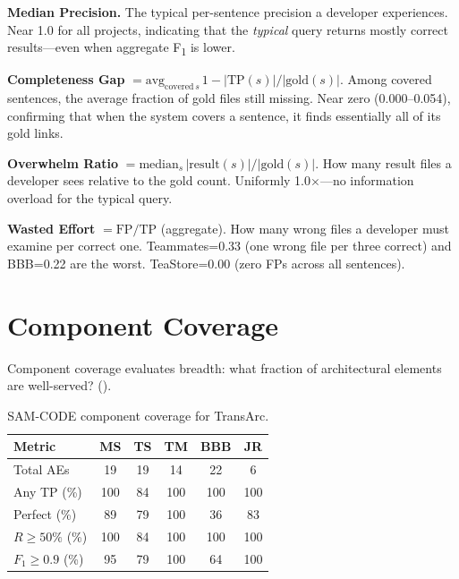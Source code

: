 \documentclass[11pt,a4paper]{report}
\newcommand{\samcode}{SAM-CODE\xspace}
\newcommand{\transarc}{TransArc\xspace}
\newcommand{\fone}{F\textsubscript{1}\xspace}
\begin{document}
\textbf{Median Precision.} The typical per-sentence precision a developer
experiences. Near 1.0 for all projects, indicating that the \emph{typical}
query returns mostly correct results---even when aggregate \fone is lower.

\textbf{Completeness Gap} $= \text{avg}_{\text{covered}\, s}\, 1 - |\text{TP}(s)|/|\text{gold}(s)|$.
Among covered sentences, the average fraction of gold files still missing.
Near zero (0.000--0.054), confirming that when the system covers a sentence, it
finds essentially all of its gold links.

\textbf{Overwhelm Ratio} $= \text{median}_{s}\, |\text{result}(s)| / |\text{gold}(s)|$.
How many result files a developer sees relative to the gold count. Uniformly
1.0$\times$---no information overload for the typical query.

\textbf{Wasted Effort} $= \text{FP} / \text{TP}$ (aggregate). How many wrong
files a developer must examine per correct one. Teammates=0.33 (one wrong file
per three correct) and BBB=0.22 are the worst. TeaStore=0.00 (zero FPs across
all sentences).


\section{Component Coverage}
\label{sec:eval:component}

Component coverage evaluates breadth: what fraction of architectural elements
are well-served? ().

\begin{table}[h]
\caption{\samcode component coverage for \transarc.}
\label{tab:component_cov}
\centering\small
\begin{tabular}{lccccc}
\toprule
\textbf{Metric} & \textbf{MS} & \textbf{TS} & \textbf{TM} & \textbf{BBB} & \textbf{JR} \\
\midrule
Total AEs          & 19   & 19   & 14   & 22   & 6   \\
Any TP (\%)        & 100  & 84   & 100  & 100  & 100 \\
Perfect (\%)       & 89   & 79   & 100  & 36   & 83  \\
$R{\geq}50\%$ (\%) & 100  & 84   & 100  & 100  & 100 \\
$F_1{\geq}0.9$ (\%) & 95  & 79   & 100  & 64   & 100 \\
\bottomrule
\end{tabular}
\end{table}
\end{document}
